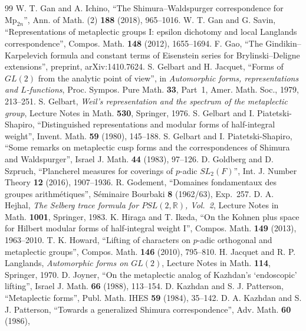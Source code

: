 \documentclass[11pt]{article}
\numberwithin{equation}{section}
\theoremstyle{plain}
\theoremstyle{definition}
\theoremstyle{remark}
\begin{document}
\begin{thebibliography}{99}
 W. T. Gan and A. Ichino, ``The Shimura--Waldspurger
correspondence for $\mathrm{Mp}_{2n}$'', Ann. of Math. (2) \textbf{188}
(2018), 965--1016.
 W. T. Gan and G. Savin, ``Representations of
metaplectic groups I: epsilon dichotomy and local Langlands
correspondence'', Compos. Math. \textbf{148} (2012), 1655--1694.
 F. Gao, ``The Gindikin--Karpelevich formula and constant
terms of Eisenstein series for Brylinski--Deligne extensions'', preprint,
arXiv:1410.7624.
 S. Gelbart and H. Jacquet, ``Forms of $GL(2)$ from the
analytic point of view'', in \emph{Automorphic forms, representations and
$L$-functions}, Proc. Sympos. Pure Math. \textbf{33}, Part~1, Amer. Math.
Soc., 1979, 213--251.
 S. Gelbart, \emph{Weil's representation and the spectrum of
the metaplectic group}, Lecture Notes in Math. \textbf{530}, Springer, 1976.
 S. Gelbart and I. Piatetski-Shapiro, ``Distinguished
representations and modular forms of half-integral weight'', Invent.
Math. \textbf{59} (1980), 145--188.
 S. Gelbart and I. Piatetski-Shapiro, ``Some remarks on
metaplectic cusp forms and the correspondences of Shimura and
Waldspurger'', Israel J. Math. \textbf{44} (1983), 97--126.
 D. Goldberg and D. Szpruch, ``Plancherel measures for
coverings of $p$-adic $SL_2(F)$'', Int. J. Number Theory \textbf{12} (2016),
1907--1936.
 R. Godement, ``Domaines fondamentaux des groupes
arithm\'etiques'', S\'eminaire Bourbaki \textbf{8} (1962/63), Exp.~257.
 D. A. Hejhal, \emph{The Selberg trace formula for
$PSL(2,\mathbb{R})$, Vol.~2}, Lecture Notes in Math. \textbf{1001},
Springer, 1983.
 K. Hiraga and T. Ikeda, ``On the Kohnen plus space for
Hilbert modular forms of half-integral weight I'', Compos. Math.
\textbf{149} (2013), 1963--2010.
 T. K. Howard, ``Lifting of characters on $p$-adic
orthogonal and metaplectic groups'', Compos. Math. \textbf{146} (2010),
795--810.
 H. Jacquet and R. P. Langlands, \emph{Automorphic forms on
$GL(2)$}, Lecture Notes in Math. \textbf{114}, Springer, 1970.
 D. Joyner, ``On the metaplectic analog of Kazhdan's
`endoscopic' lifting'', Israel J. Math. \textbf{66} (1988), 113--154.
 D. Kazhdan and S. J. Patterson, ``Metaplectic forms'', Publ.
Math. IHES \textbf{59} (1984), 35--142.
 D. A. Kazhdan and S. J. Patterson, ``Towards a
generalized Shimura correspondence'', Adv. Math. \textbf{60} (1986),

\end{thebibliography}
\end{document}
